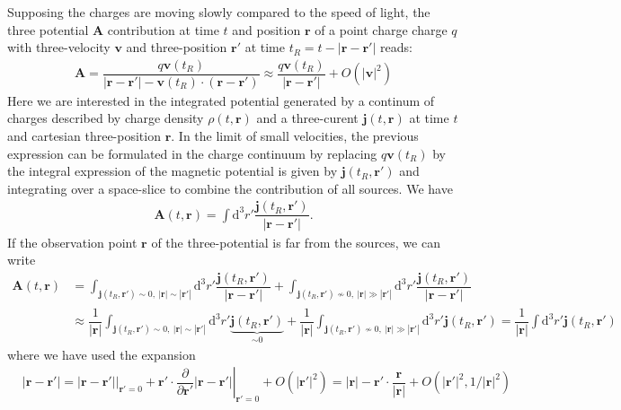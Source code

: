 \documentclass[10pt, a4paper]{article}
\begin{document}
{Supposing the charges are moving slowly compared to the speed of light, the three potential $\mathbf{A}$ contribution at time $t$ and position $\mathbf{r}$ of a point charge charge $q$ with three-velocity $\mathbf{v}$ and three-position $\mathbf{r}'$ at time $t_R = t-|\mathbf{r} - \mathbf{r}'|$ reads: 
\begin{align*}
   \mathbf{A} =  \dfrac{q \mathbf{v}(t_R)}{|\mathbf{r} - \mathbf{r}'| - \mathbf{v}(t_R) \cdot (\mathbf{r} - \mathbf{r}')} \approx  \dfrac{q \mathbf{v}(t_R)}{|\mathbf{r} - \mathbf{r}'|} + O(|\mathbf{v}|^2)
\end{align*}
Here we are interested in the integrated potential generated by a continum of charges described by charge density $\rho(t, \mathbf{r})$ and a three-curent $\mathbf{j}(t, \mathbf{r})$ at time $t$ and cartesian three-position $\mathbf{r}$. In the limit of small velocities, the previous expression can be formulated in the charge continuum by replacing $q \mathbf{v}(t_R)$ by  the integral expression of the magnetic potential is given by $\mathbf{j}(t_R, \mathbf{r}')$ and integrating over a space-slice to combine the contribution of all sources. We have 
\begin{align*}
    \mathbf{A}(t, \mathbf{r}) = \int \text{d}^3r' \dfrac{\mathbf{j}(t_R, \mathbf{r}')}{|\mathbf{r} - \mathbf{r}'|}.
\end{align*}
If the observation point $\mathbf{r}$ of the three-potential is far from the sources, we can write 
\begin{align*}
    \mathbf{A}(t, \mathbf{r}) &= \int_{\mathbf{j}(t_R, \mathbf{r}') \sim 0,\ |\mathbf{r}|\sim |\mathbf{r}'|} \text{d}^3r' \dfrac{\mathbf{j}(t_R, \mathbf{r}')}{|\mathbf{r} - \mathbf{r}'|} + \int_{\mathbf{j}(t_R, \mathbf{r}') \not\sim 0,\ |\mathbf{r}|\gg |\mathbf{r}'|} \text{d}^3r' \dfrac{\mathbf{j}(t_R, \mathbf{r}')}{|\mathbf{r} - \mathbf{r}'|} \\&\approx \dfrac{1}{|\mathbf{r}|}\int_{\mathbf{j}(t_R, \mathbf{r}') \sim 0,\ |\mathbf{r}|\sim |\mathbf{r}'|} \text{d}^3r' \underbrace{\mathbf{j}(t_R, \mathbf{r}')}_{\sim 0}+ \dfrac{1}{|\mathbf{r}|}\int_{\mathbf{j}(t_R, \mathbf{r}') \not\sim 0,\ |\mathbf{r}|\gg |\mathbf{r}'|} \text{d}^3r' \mathbf{j}(t_R, \mathbf{r}') =  \dfrac{1}{|\mathbf{r}|} \int \text{d}^3r' \mathbf{j}(t_R, \mathbf{r}')
\end{align*}
where we have used the expansion 
\begin{align*}
    &|\mathbf{r}-\mathbf{r}'| =   \left.|\mathbf{r}-\mathbf{r}'|\right|_{\mathbf{r}' = 0} + \mathbf{r}'\cdot \left.\dfrac{\partial}{\partial \mathbf{r}'} |\mathbf{r}-\mathbf{r}'|\right|_{\mathbf{r}' = 0} + O(|\mathbf{r}'|^2) = |\mathbf{r}| - \mathbf{r}'\cdot\dfrac{\mathbf{r}}{|\mathbf{r}|} + O(|\mathbf{r}'|^2, 1/|\mathbf{r}|^2)\\

\end{align*}}
\end{document}
